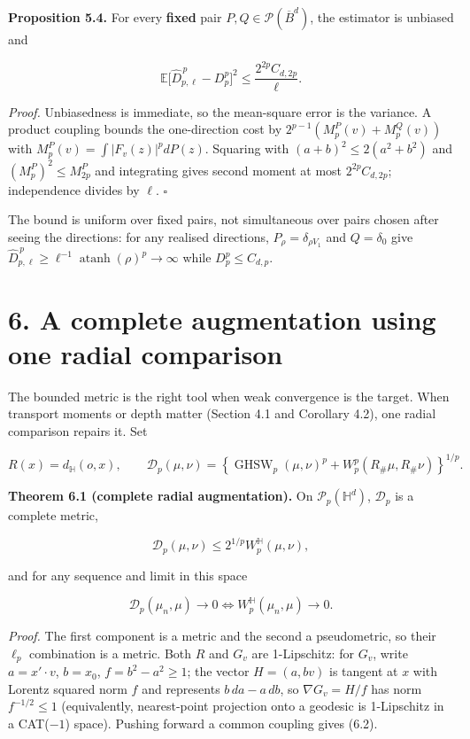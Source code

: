 \documentclass[
  british,
  11pt,
  a4paper,
]{article}
\begin{document}
\textbf{Proposition 5.4.} For every \textbf{fixed} pair
\(P,Q\in\mathcal P(\overline B^d)\), the estimator is unbiased and

\[
\mathbb E\bigl[\widehat D_{p,\ell}^{\,p}-D_p^p\bigr]^2
\leq\frac{2^{2p}C_{d,2p}}\ell.
\tag{5.11}
\]

\emph{Proof.} Unbiasedness is immediate, so the mean-square error is the
variance. A product coupling bounds the one-direction cost by
\(2^{p-1}(M_p^P(v)+M_p^Q(v))\) with \(M_p^P(v)=\int|F_v(z)|^pdP(z)\).
Squaring with \((a+b)^2\leq2(a^2+b^2)\) and \((M_p^P)^2\leq M_{2p}^P\)
and integrating gives second moment at most \(2^{2p}C_{d,2p}\);
independence divides by \(\ell\). \(\square\)

The bound is uniform over fixed pairs, not simultaneous over pairs
chosen after seeing the directions: for any realised directions,
\(P_\rho=\delta_{\rho V_1}\) and \(Q=\delta_0\) give
\(\widehat D_{p,\ell}^{\,p}\geq\ell^{-1}\operatorname{atanh}(\rho)^p\to\infty\)
while \(D_p^p\leq C_{d,p}\).

\section{6. A complete augmentation using one radial
comparison}\label{a-complete-augmentation-using-one-radial-comparison}

The bounded metric is the right tool when weak convergence is the
target. When transport moments or depth matter (Section 4.1 and
Corollary 4.2), one radial comparison repairs it. Set

\[
R(x)=d_{\mathbb H}(o,x),\qquad
\mathcal D_p(\mu,\nu)
=\left\{\operatorname{GHSW}_p(\mu,\nu)^p+W_p^p(R_\#\mu,R_\#\nu)\right\}^{1/p}.
\tag{6.1}
\]

\textbf{Theorem 6.1 (complete radial augmentation).} On
\(\mathcal P_p(\mathbb H^d)\), \(\mathcal D_p\) is a complete metric,

\[
\mathcal D_p(\mu,\nu)\leq2^{1/p}W_p^{\mathbb H}(\mu,\nu),
\tag{6.2}
\]

and for any sequence and limit in this space

\[
\mathcal D_p(\mu_n,\mu)\to0
\iff
W_p^{\mathbb H}(\mu_n,\mu)\to0.
\tag{6.3}
\]

\emph{Proof.} The first component is a metric and the second a
pseudometric, so their \(\ell_p\) combination is a metric. Both \(R\)
and \(G_v\) are 1-Lipschitz: for \(G_v\), write \(a=x'\cdot v\),
\(b=x_0\), \(f=b^2-a^2\geq1\); the vector \(H=(a,bv)\) is tangent at
\(x\) with Lorentz squared norm \(f\) and represents \(b\,da-a\,db\), so
\(\nabla G_v=H/f\) has norm \(f^{-1/2}\leq1\) (equivalently,
nearest-point projection onto a geodesic is 1-Lipschitz in a CAT(\(-1\))
space). Pushing forward a common coupling gives (6.2).
\end{document}
